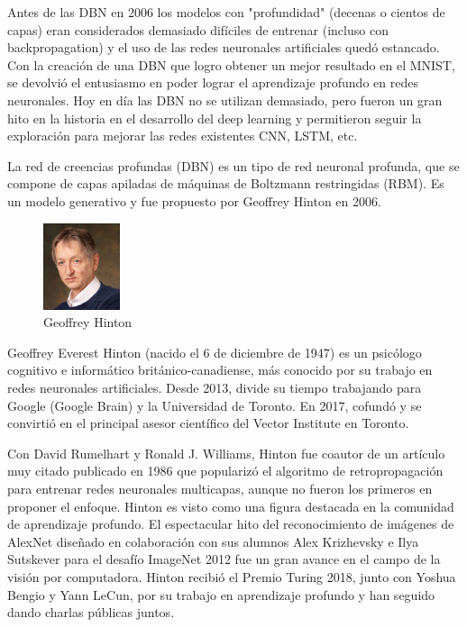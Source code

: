 \documentclass[a4paper]{article}
\begin{document}
Antes de las DBN en 2006 los modelos con "profundidad" (decenas o 
cientos de capas) eran considerados demasiado difíciles de 
entrenar (incluso con backpropagation) y el uso de las redes 
neuronales artificiales quedó estancado. Con la creación de una 
DBN que logro obtener un mejor resultado en el MNIST, se devolvió 
el entusiasmo en poder lograr el aprendizaje profundo en redes 
neuronales. Hoy en día las DBN no se utilizan demasiado, pero 
fueron un gran hito en la historia en el desarrollo del deep 
learning y permitieron seguir la exploración para mejorar las 
redes existentes CNN, LSTM, etc.

La red de creencias profundas (DBN) es un tipo de red neuronal 
profunda, que se compone de capas apiladas de máquinas de 
Boltzmann restringidas (RBM). Es un modelo generativo y fue 
propuesto por Geoffrey Hinton en 2006.

\begin{figure} %
    \centering
    \includegraphics[width=0.2\textwidth]{./images/Geoffrey_Hinton.jpeg}
    \caption{Geoffrey Hinton}
\end{figure}

Geoffrey Everest Hinton (nacido el 6 de diciembre de 1947) es un 
psicólogo cognitivo e informático británico-canadiense, más 
conocido por su trabajo en redes neuronales artificiales. Desde 
2013, divide su tiempo trabajando para Google (Google Brain) y la 
Universidad de Toronto. En 2017, cofundó y se convirtió en el 
principal asesor científico del Vector Institute en Toronto\cite{wikigeoffrey}.

Con David Rumelhart y Ronald J. Williams, Hinton fue coautor de un 
artículo muy citado publicado en 1986 que popularizó el algoritmo 
de retropropagación para entrenar redes neuronales multicapas, 
aunque no fueron los primeros en proponer el enfoque. Hinton es 
visto como una figura destacada en la comunidad de aprendizaje 
profundo. El espectacular hito del reconocimiento de imágenes de 
AlexNet diseñado en colaboración con sus alumnos Alex Krizhevsky e 
Ilya Sutskever para el desafío ImageNet 2012 fue un gran avance en 
el campo de la visión por computadora.
Hinton recibió el Premio Turing 2018, junto con Yoshua Bengio y 
Yann LeCun, por su trabajo en aprendizaje profundo y han seguido 
dando charlas públicas juntos.
\end{document}
